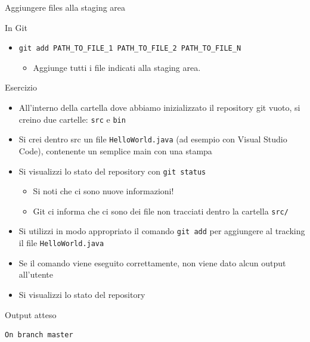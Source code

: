 \documentclass[xcolor=dvipsnames,presentation]{beamer}
\begin{document}
\begin{frame}{Aggiungere files alla staging area}
\begin{block}{In Git}
\begin{itemize}
\begin{itemize}
                \item Aggiunge il file indicato alla staging area. Il file deve essere all'interno
del repository.
                \item Il file deve essere cambiato rispetto allo stato precedente (perché nuovo,
modificato, o cancellato)
                \item Il file può essere un file che esisteva ma è stato cancellato!
                \item In questo caso, viene registrata nella staging area la cancellazione
            \end{itemize}
            \item \texttt{git add PATH\_TO\_FILE\_1 PATH\_TO\_FILE\_2 PATH\_TO\_FILE\_N}
            \begin{itemize}
                \item Aggiunge tutti i file indicati alla staging area.
            \end{itemize}
        \end{itemize}
    \end{block}
    \begin{block}{Esercizio}
        \begin{itemize}
            \item All'interno della cartella dove abbiamo inizializzato il repository git vuoto, si
creino due cartelle: \texttt{src} e \texttt{bin}
            \item Si crei dentro src un file \texttt{HelloWorld.java} (ad esempio con Visual Studio Code), contenente un semplice main con una stampa
            \item Si visualizzi lo stato del repository con \texttt{git status}
            \begin{itemize}
                \item Si noti che ci sono nuove informazioni!
                \item Git ci informa che ci sono dei file non tracciati dentro la cartella
\texttt{src/}
            \end{itemize}
            \item Si utilizzi in modo appropriato il comando \texttt{git add} per aggiungere al
tracking il file \texttt{HelloWorld.java}
            \item Se il comando viene eseguito correttamente, non viene dato alcun output all'utente
            \item Si visualizzi lo stato del repository
        \end{itemize}
    \end{block}
    \begin{block}{Output atteso}
        \begin{Verbatim}[fontsize=\scriptsize]
On branch master


\end{Verbatim}
\end{block}
\end{frame}
\end{document}
